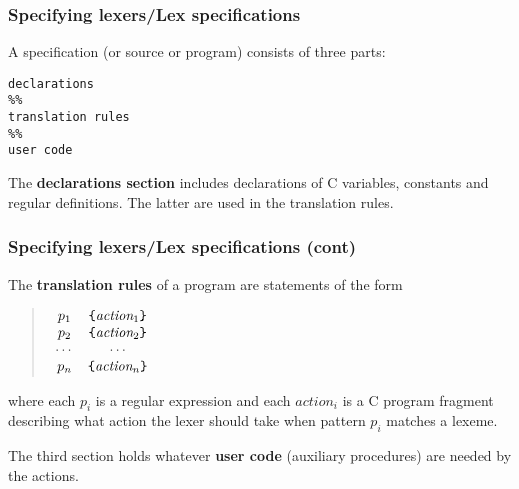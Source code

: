% 
\begin{frame}[containsverbatim]
\frametitle{Specifying lexers/Lex specifications}
 
A \Lex specification (or source or program) consists of three parts:
{\small
\begin{verbatim}
declarations
%%
translation rules
%%
user code
\end{verbatim}
}
The \textbf{declarations section} includes declarations of C
variables, constants and regular definitions. The latter are used in
the translation rules.

\end{frame}

% 
\begin{frame}[containsverbatim]
\frametitle{Specifying lexers/Lex specifications (cont)}
 
The \textbf{translation rules} of a \Lex program are statements of
the form
\begin{quote}
\(
\begin{array}{cc}
p_1 & \verb+{+ \textit{action}_1 \verb+}+\\
p_2 & \verb+{+ \textit{action}_2 \verb+}+\\
\cdots & \cdots\\
p_n & \verb+{+ \textit{action}_n \verb+}+
\end{array}
\)
\end{quote}
where each \(p_i\) is a regular expression and each
\(\textit{action}_i\) is a C program fragment describing what action
the lexer should take when pattern \(p_i\) matches a lexeme.

\bigskip

The third section holds whatever \textbf{user code} (auxiliary
procedures) are needed by the actions.

\end{frame}

